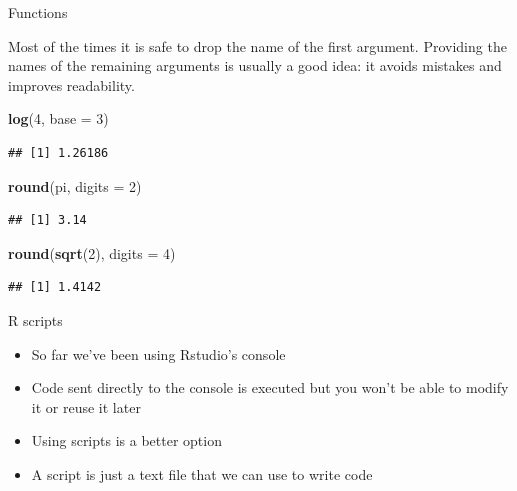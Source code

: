 \documentclass[ignorenonframetext,]{beamer}
\newenvironment{Shaded}{\begin{snugshade}}{\end{snugshade}}
\newcommand{\DataTypeTok}[1]{\textcolor[rgb]{0.13,0.29,0.53}{#1}}
\newcommand{\DecValTok}[1]{\textcolor[rgb]{0.00,0.00,0.81}{#1}}
\newcommand{\KeywordTok}[1]{\textcolor[rgb]{0.13,0.29,0.53}{\textbf{#1}}}
\newcommand{\NormalTok}[1]{#1}
\begin{document}
\begin{frame}[fragile]{Functions}
\protect\hypertarget{functions-10}{}

Most of the times it is safe to drop the name of the first argument.
Providing the names of the remaining arguments is usually a good idea:
it avoids mistakes and improves readability.

\begin{Shaded}
\begin{Highlighting}[]
\KeywordTok{log}\NormalTok{(}\DecValTok{4}\NormalTok{, }\DataTypeTok{base =} \DecValTok{3}\NormalTok{)}
\end{Highlighting}
\end{Shaded}

\begin{verbatim}
## [1] 1.26186
\end{verbatim}

\begin{Shaded}
\begin{Highlighting}[]
\KeywordTok{round}\NormalTok{(pi, }\DataTypeTok{digits =} \DecValTok{2}\NormalTok{)}
\end{Highlighting}
\end{Shaded}

\begin{verbatim}
## [1] 3.14
\end{verbatim}

\begin{Shaded}
\begin{Highlighting}[]
\KeywordTok{round}\NormalTok{(}\KeywordTok{sqrt}\NormalTok{(}\DecValTok{2}\NormalTok{), }\DataTypeTok{digits =} \DecValTok{4}\NormalTok{)}
\end{Highlighting}
\end{Shaded}

\begin{verbatim}
## [1] 1.4142
\end{verbatim}

\end{frame}

\begin{frame}{R scripts}
\protect\hypertarget{r-scripts}{}

\begin{itemize}
\item
  So far we've been using Rstudio's console
\item
  Code sent directly to the console is executed but you won't be able to
  modify it or reuse it later
\item
  Using scripts is a better option
\item
  A script is just a text file that we can use to write code
\end{itemize}

\end{frame}
\end{document}
